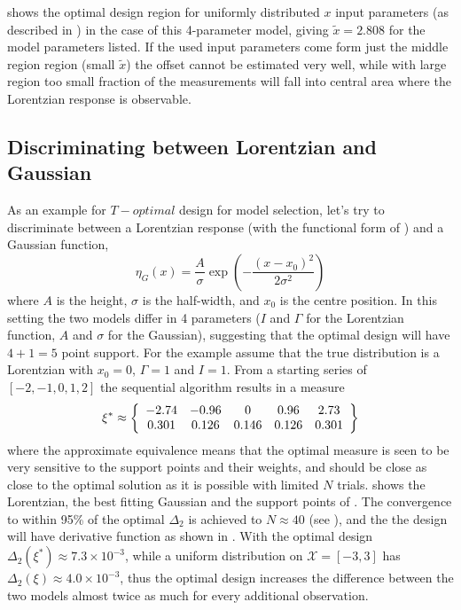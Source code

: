 \documentclass[12pt]{iopart}
\begin{document}
 shows the optimal design region for uniformly distributed $x$ input parameters (as described in ) in the case of this 4-parameter model, giving $\tilde x = 2.808$ for the model parameters listed. If the used input parameters come form just the middle region region (small $\tilde x$) the offset cannot be estimated very well, while with large region too small fraction of the measurements will fall into central area where the Lorentzian response is observable.

\subsection{Discriminating between Lorentzian and Gaussian}

As an example for $T-optimal$ design for model selection, let's try to discriminate between a Lorentzian response (with the functional form of ) and a Gaussian function,
\begin{equation}
\eta_G(x) = \frac{A}{\sigma} \exp\left(-\frac{(x-x_0)^2}{2 \sigma^2}\right)
\label{eq:gauss}
\end{equation}
where $A$ is the height, $\sigma$ is the half-width, and $x_0$ is the centre position. In this setting the two models differ in 4 parameters ($I$ and $\Gamma$ for the Lorentzian function, $A$ and $\sigma$ for the Gaussian), suggesting that the optimal design will have $4+1=5$ point support. For the example assume that the true distribution is a Lorentzian with $x_0 = 0$, $\Gamma = 1$  and $I = 1$. From a starting series of $[-2, -1, 0, 1, 2]$ the sequential algorithm results in a measure
\begin{equation}
\xi^* \approx \left\{
  \begin{array}{c c c c c}
    -2.74 & -0.96 & 0 & 0.96 & 2.73\\
    0.301 & 0.126 & 0.146 & 0.126 & 0.301\\
  \end{array} \right \}
\label{eq:lorgauss}
\end{equation}
where the approximate equivalence means that the optimal measure is seen to be very sensitive to the support points and their weights, and  should be close as close to the optimal solution as it is possible with limited $N$ trials.  shows the Lorentzian, the best fitting Gaussian and the support points of . The convergence to within 95\% of the optimal $\Delta_2$ is achieved to $N \approx 40$ (see ), and the the design will have derivative function as shown in .
With the optimal design $\Delta_2(\xi^*) \approx 7.3 \times 10^{-3}$, while a uniform distribution on $\mathcal{X} = [-3, 3]$ has $\Delta_2(\xi) \approx 4.0 \times 10^{-3}$, thus the optimal design increases the difference between the two models almost twice as much for every additional observation.
\end{document}
